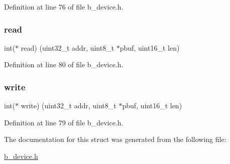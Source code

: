 Definition at line 76 of file b\+\_\+device.\+h.

\mbox{\label{structb_driver_interface__t_a671c1e21440d7a8a58f1e244a4880d6f}} 
\subsubsection{\texorpdfstring{read}{read}}
{\footnotesize\ttfamily int($\ast$ read) (uint32\+\_\+t addr, uint8\+\_\+t $\ast$pbuf, uint16\+\_\+t len)}



Definition at line 80 of file b\+\_\+device.\+h.

\mbox{\label{structb_driver_interface__t_af67fbf8f75e899efac0872e7469a33c2}} 
\subsubsection{\texorpdfstring{write}{write}}
{\footnotesize\ttfamily int($\ast$ write) (uint32\+\_\+t addr, uint8\+\_\+t $\ast$pbuf, uint16\+\_\+t len)}



Definition at line 79 of file b\+\_\+device.\+h.



The documentation for this struct was generated from the following file\+:\begin{DoxyCompactItemize}
\item 
\mbox{\hyperlink{b__device_8h}{b\+\_\+device.\+h}}\end{DoxyCompactItemize}
